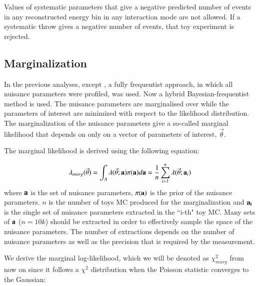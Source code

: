 Values of systematic parameters that give a negative predicted number of events in any reconstructed energy bin in any interaction 
mode are not allowed. If a systematic throw gives a negative number of events, that toy experiment is rejected.


\subsection {Marginalization}
\label{sec:marginalization}

In the previous analyses,
except \cite{OurRun56AntiNueBarAppearanceAnalysis3Flavour},
 a fully frequentist approach, in which all nuisance parameters were profiled, was used.
Now a hybrid Bayesian-frequentist method is used. 
The nuisance parameters are marginalised over while the parameters of interest are minimized with respect to the likelihood distribution.
The marginalization of the nuisance parameters give a so-called marginal likelihood that depends on only
on a vector of parameters of interest, $\vec{\theta}$.

The marginal likelihood is derived using the following equation:

\begin{equation}\label{eq:likemarg}
\lambda_{marg} (\vec{\theta}) = \int_{A} \lambda (\vec{\theta};{\bf a}) \pi{({\bf a})} d {\bf a} = \frac{1}{n} \sum_{i=1}^{n} 
\lambda (\vec{\theta}; {\bf a}_i) 
\end{equation}
where ${\bf a}$ is the set of nuisance parameters, $\pi{({\bf a})}$ is the prior of the nuisance parameters.
$n$ is the number of toys MC produced for the marginalization and
${\bf a_i}$ is the single set of nuisance parameters extracted in the ``i-th" toy MC.
Many sets of ${\bf a}$ ($n = 10k$) should be extracted in order to effectively sample the space of the nuisance parameters.
The number of extractions depends on the number of nuisance parameters as well as the precision that is required by the measurement.

We derive the marginal log-likelihood, which we will be denoted as $\chi^2_{marg}$ from now on
since it follows a $\chi^2$ distribution when the Poisson statistic converges to the Gaussian:

